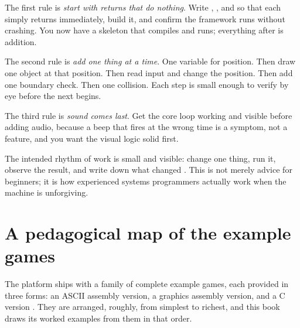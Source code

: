 The first rule is \emph{start with returns that do nothing}. Write ,
, and  so that each simply returns immediately, build it,
and confirm the framework runs without crashing. You now have a skeleton that
compiles and runs; everything after is addition.

The second rule is \emph{add one thing at a time}. One variable for position.
Then draw one object at that position. Then read input and change the position.
Then add one boundary check. Then one collision. Each step is small enough to
verify by eye before the next begins.

The third rule is \emph{sound comes last}. Get the core loop working and visible
before adding audio, because a beep that fires at the wrong time is a symptom, not
a feature, and you want the visual logic solid first.

\begin{prgconcept}
The intended rhythm of work is small and visible: change one thing, run it,
observe the result, and write down what changed \citep{prg32repo}. This is not
merely advice for beginners; it is how experienced systems programmers actually
work when the machine is unforgiving.
\end{prgconcept}

\section{A pedagogical map of the example games}

The platform ships with a family of complete example games, each provided in
three forms: an ASCII assembly version, a graphics assembly version, and a C
version \citep{prg32repo}. They are arranged, roughly, from simplest to richest,
and this book draws its worked examples from them in that order.


